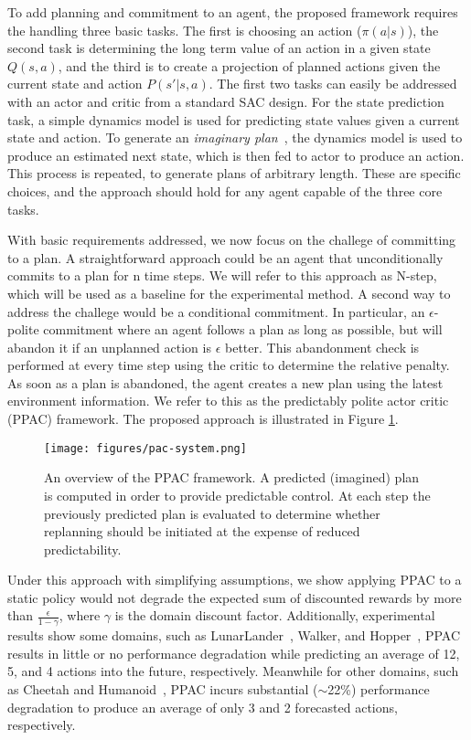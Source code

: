 \documentclass{article}
\begin{document}
        To add planning and commitment to an agent, the proposed framework requires the handling three basic tasks. The first is choosing an action (\(\pi(a | s)\)), the second task is determining the long term value of an action in a given state \(Q(s,a)\), and the third is to create a projection of planned actions given the current state and action \(P(s' | s,a)\). The first two tasks can easily be addressed with an actor and critic from a standard SAC design. For the state prediction task, a simple dynamics model is used for predicting state values given a current state and action. To generate an \textit{imaginary plan}~\cite{racaniere2017imagination}, the dynamics model is used to produce an estimated next state, which is then fed to actor to produce an action. This process is repeated, to generate plans of arbitrary length. These are specific choices, and the approach should hold for any agent capable of the three core tasks.
        
        With basic requirements addressed, we now focus on the challege of committing to a plan. A straightforward approach could be an agent that unconditionally commits to a plan for n time steps. We will refer to this approach as N-step, which will be used as a baseline for the experimental method. A second way to address the challege would be a conditional commitment. In particular, an $\epsilon$-polite commitment where an agent follows a plan as long as possible, but will abandon it if an unplanned action is $\epsilon$ better. This abandonment check is performed at every time step using the critic to determine the relative penalty. As soon as a plan is abandoned, the agent creates a new plan using the latest environment information. We refer to this as the predictably polite actor critic (PPAC) framework. The proposed approach is illustrated in Figure \ref{pac-system}.
        
        \begin{figure}
            \texttt{[image: figures/pac-system.png]}
            \caption{An overview of the PPAC framework. A predicted (imagined) plan is computed in order to provide predictable control. At each step the previously predicted plan is evaluated to determine whether replanning should be initiated at the expense of reduced predictability.}
            \label{pac-system}
        \end{figure}
        
        Under this approach with simplifying assumptions, we show applying PPAC to a static policy would not degrade the expected sum of discounted rewards by more than $\frac{\epsilon}{1-\gamma}$, where $\gamma$ is the domain discount factor. Additionally, experimental results show some domains, such as LunarLander~\cite{gym}, Walker, and Hopper~\cite{pybullet}, PPAC results in little or no performance degradation while predicting an average of 12, 5, and 4 actions into the future, respectively. Meanwhile for other domains, such as Cheetah and Humanoid~\cite{pybullet}, PPAC incurs substantial ($\sim$22\%) performance degradation to produce an average of only 3 and 2 forecasted actions, respectively.
        
\end{document}
